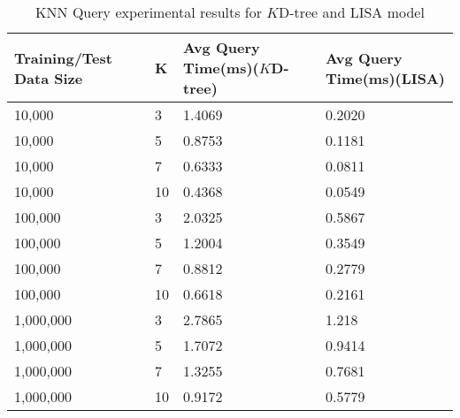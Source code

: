 \begin{table}
	\centering
\centering
	\begin{tabular}{||p{}<{\centering}|p{}<{\centering}|p{}<{\centering}|p{}<{\centering}||}
		\hline
		Training/Test Data Size& K & Avg Query Time(ms)($K$D-tree) & Avg Query Time(ms)(LISA)\\ [0.5ex] 
		\hline
		\hline
	 	10,000& 3& 1.4069 &0.2020 \\
	 	\hline
	 	10,000& 5& 0.8753 &0.1181\\
	 	\hline
	 	10,000& 7& 0.6333 &0.0811 \\
	 	\hline
	 	10,000 & 10& 0.4368 &0.0549 \\
	 	\hline
	 	100,000 & 3& 2.0325 &0.5867 \\
	 	\hline
	 	100,000 & 5& 1.2004 &0.3549 \\
	 	\hline
	 	100,000 & 7& 0.8812 &0.2779 \\
	 	\hline
	 	100,000 & 10&  0.6618 &0.2161 \\
	 	\hline
	    1,000,000 & 3& 2.7865 & 1.218 \\
	 	\hline
	 	1,000,000 & 5& 1.7072 &0.9414 \\
	 	\hline
	 	1,000,000 & 7& 1.3255 &0.7681 \\
	 	\hline
	 	1,000,000 & 10& 0.9172 &0.5779 \\
		\hline
		\hline
	\end{tabular}
	\caption{KNN Query experimental results for $K$D-tree and LISA model}
	\label{KNN_Query_Experimental_Results}

\end{table}